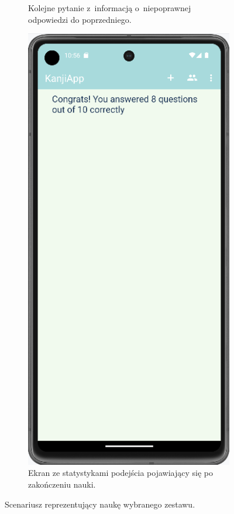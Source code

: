 \documentclass[a4paper,twoside,12pt]{book}
\begin{document}
\begin{figure}
\begin{subfigure}{0.3\textwidth}
   \caption{Kolejne pytanie z~informacją o~niepoprawnej odpowiedzi do poprzedniego.}
   \label{fig:incorrect}
\end{subfigure}
\hfill
\begin{subfigure}{0.3\textwidth}
   \includegraphics[width=\textwidth]{learn/stats}
   \caption{Ekran ze statystykami podejścia pojawiający się po zakończeniu nauki.}
   \label{fig:stats}
\end{subfigure}
 

\caption{Scenariusz reprezentujący naukę wybranego zestawu.}
\label{fig:study}
\end{figure}
\end{document}
